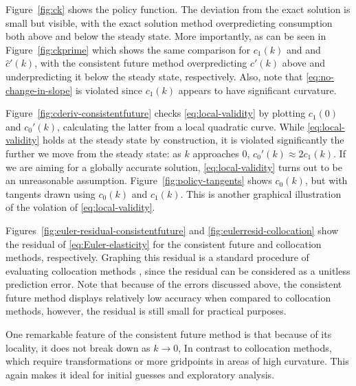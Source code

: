 \documentclass[a4paper,11pt]{article}
\newcommand{\hc}{\hat{c}}
\begin{document}
Figure~\ref{fig:ck} shows the policy function. The deviation from the exact solution is small but visible, with the exact solution method overpredicting consumption both above and below the steady state. More importantly, as can be seen in Figure~\ref{fig:ckprime} which shows the same comparison for $c_1(k)$ and and $\hc'(k)$, with the consistent future method overpredicting $c'(k)$ above and underpredicting it below the steady state, respectively. Also, note that \eqref{eq:no-change-in-slope} is violated since $c_1(k)$ appears to have significant curvature.

Figure~\ref{fig:cderiv-consistentfuture} checks \eqref{eq:local-validity} by plotting $c_1(0)$ and $c_0'(k)$, calculating the latter from a local quadratic curve. While \eqref{eq:local-validity} holds at the steady state by construction, it is violated significantly the further we move from the steady state: as $k$ approaches $0$, $c_0'(k) \approx 2 c_1(k)$. If we are aiming for a globally accurate solution, \eqref{eq:local-validity} turns out to be an unreasonable assumption. Figure~\ref{fig:policy-tangents} shows $c_0(k)$, but with tangents drawn using $c_0(k)$ and $c_1(k)$. This is another graphical illustration of the volation of \eqref{eq:local-validity}.

Figures~\ref{fig:euler-residual-consistentfuture} and \ref{fig:eulerresid-collocation} show the residual of \eqref{eq:Euler-elasticity} for the consistent future and collocation methods, respectively. Graphing this residual is a standard procedure of evaluating collocation methods \parencite{boyd2001chebyshev, judd98:_numer_method_in_econom}, since the residual can be considered as a unitless prediction error. Note that because of the errors discussed above, the consistent future method displays relatively low accuracy when compared to collocation methods, however, the residual is still small for practical purposes.

One remarkable feature of the consistent future method is that because of its locality, it does not break down as $k\to0$, In contrast to collocation methods, which require transformations or more gridpoints in areas of high curvature. This again makes it ideal for initial guesses and exploratory analysis.
\end{document}
